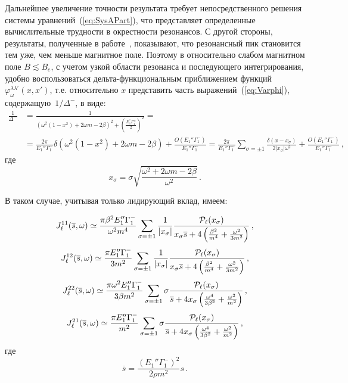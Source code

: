 \documentclass[14pt, russian]{article}
\begin{document}
Дальнейшее увеличение точности результата требует непосредственного решения системы уравнений~(\ref{eq:SysAPart}), что представляет определенные вычислительные трудности в окрестности резонансов. С другой стороны, результаты, полученные в работе~\cite{Rumyantsev:2026}, показывают, что резонансный пик становится тем уже, чем меньше магнитное поле. Поэтому в относительно слабом магнитном поле $B\lesssim B_e$, с учетом узкой области резонанса и последующего интегрирования, удобно воспользоваться дельта-функциональным приближением функций $\varphi_\omega^{\lambda\lambda'}(x,x')$, т.е. относительно $x$ представить часть выражений~(\ref{eq:Varphi}), содержащую~$1/\Delta^-$, в виде:
\begin{equation}\label{eq:DeltaMDelta}
	\begin{aligned}
		\frac{1}{\Delta^-}&=\frac{1}{(\omega^2(1-x^2)+2 \omega m - 2\beta)^2 + \left(\frac{E_1^{''} \Gamma_1^\pm}{2}\right)^2}=
		\\
		&= \frac{2\pi}{E_1''\Gamma_1^-} \delta(\omega^2(1-x^2)+2 \omega m - 2\beta) + \frac{O(E_1''\Gamma_1^-)}{E_1''\Gamma_1^-}
		=
		\frac{2\pi}{E_1''\Gamma_1^-}\sum_{\sigma=\pm1}\frac{\delta(x-x_\sigma)}{2 |x_\sigma| \omega^2} + \frac{O(E_1''\Gamma_1^-)}{E_1''\Gamma_1^-} \, ,
	\end{aligned}
\end{equation} 
где 
\begin{equation}\label{eq:xi}
	x_\sigma = \sigma \sqrt{\frac{\omega^2+2\omega m - 2\beta}{\omega^2}}\, .
\end{equation}

В таком случае, учитывая только лидирующий вклад, имеем: 

\begin{equation}\label{eq:J110}
	J_\ell^{11}(\overline{s},\omega) \simeq\frac{\pi\beta^2 E_1''\Gamma_1^-}{\omega^2m^4}\sum_{\sigma=\pm1}\frac{1}{|x_\sigma|}\frac{{\cal P}_\ell(x_\sigma)}{x_\sigma \overline{s}+ 4\left(\frac{\beta^2}{m^4}+\frac{\omega^2}{3m^2}\right)} \, ,
\end{equation}
\begin{equation}\label{eq:J120}
	J_\ell^{12}(\overline{s},\omega) \simeq \frac{\pi E''_1\Gamma_1^-}{3m^2}\sum_{\sigma=\pm1}\frac{1}{|x_\sigma|} \frac{{\cal P}_\ell(x_\sigma)}{ x_\sigma\overline{s}+4\left(\frac{\beta^2}{m^4}+\frac{\omega^2}{3m^2}\right)} 
	\, ,
\end{equation}
\begin{equation}\label{eq:J220}
	J_\ell^{22}(\overline{s},\omega) \simeq\frac{\pi\omega^2 E''_1\Gamma_1^-}{3\beta m^2 }\sum_{\sigma=\pm1}\sigma \frac{{\cal P}_\ell(x_\sigma)}{\overline{s}+ 4x_\sigma \left(\frac{\omega^4}{3\beta^2 } + \frac{\omega^2}{m^2}\right)}
	\, ,
\end{equation}
\begin{equation}\label{eq:21J210}
	J_\ell^{21}(\overline{s},\omega) \simeq \frac{\pi E_1''\Gamma_1^-}{m^2}\sum_{\sigma=\pm1}\sigma \frac{{\cal P}_\ell(x_\sigma)}{\overline{s}+ 4x_\sigma \left(\frac{\omega^4}{3\beta^2 } + \frac{\omega^2}{m^2}\right)}
	\, ,
\end{equation}
где
\begin{equation}
	\overline{s}= \frac{(E_1''\Gamma_1^-)^2}{2\rho m^2} s\, .
\end{equation}
\end{document}
